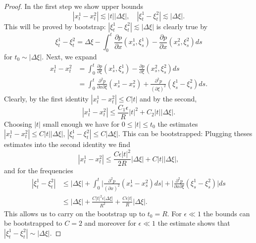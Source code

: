 \documentclass{amsart}
\theoremstyle{definition}
\begin{document}
\begin{proof}
In the first step we show upper bounds
\begin{equation*}
|x_t^1 - x_t^2| \lesssim |t| |\Delta \xi|, \quad |\xi_t^1 - \xi_t^2| \lesssim |\Delta \xi|.
\end{equation*}
This will be proved by bootstrap: $|\xi_t^1 - \xi_t^2| \lesssim |\Delta \xi|$ is clearly true by
\begin{equation*}
\xi_t^1 - \xi_t^2 = \Delta \xi - \int_0^t \frac{\partial p}{\partial x}(x_s^1,\xi_s^1) - \frac{\partial p}{\partial x}(x_s^2,\xi_s^2) ds
\end{equation*}
for $t_0 \sim |\Delta \xi|$.
Next, we expand
\begin{equation}
\label{eq:xtExpand}
\begin{split}
x_t^1 - x_t^2 &= \int_0^t \frac{\partial p}{\partial \xi}(x_s^1,\xi_s^1) - \frac{\partial p}{\partial \xi}(x_s^2,\xi_s^2) ds \\
&= \int_0^t \frac{\partial^2 p}{\partial x \partial \xi}(x_s^1-x_s^2) + \frac{\partial^2 p }{(\partial \xi)^2} (\xi_s^1 - \xi_s^2) ds.
\end{split}
\end{equation}
Clearly, by the first identity $|x_t^1 - x_t^2| \leq C |t|$ and by the second,
\begin{equation*}
|x_t^1 - x_t^2| \leq \frac{C_1 \epsilon}{R} |t|^2 + C_2 |t| |\Delta \xi|.
\end{equation*}
Choosing $|t|$ small enough we have for $0 \leq |t| \leq t_0$ the estimates $|x_t^1 - x_t^2| \leq C |t| |\Delta \xi|$, $|\xi_t^1 - \xi_t^2| \leq C |\Delta \xi|$. This can be bootstrapped: Plugging theses estimates into the second identity we find
\begin{equation*}
|x_t^1 - x_t^2| \leq \frac{C \epsilon |t|^2}{2R} |\Delta \xi| + C |t| |\Delta \xi|,
\end{equation*}
and for the frequencies
\begin{equation*}
\begin{split}
|\xi_t^1 - \xi_t^2| &\leq |\Delta \xi| + \int_0^t \big| \frac{\partial^2 p}{(\partial x)^2}(x_s^1 - x_s^2) ds \big| + \big| \frac{\partial^2 p}{\partial x \partial \xi} (\xi_s^1 - \xi_s^2) \big| ds \\
&\leq |\Delta \xi| + \frac{C |t|^2 \epsilon |\Delta \xi|}{R^2} + \frac{C \epsilon |t|}{R} |\Delta \xi|.
\end{split}
\end{equation*}
This allows us to carry on the bootstrap up to $t_0 = R$. For $\epsilon \ll 1$ the bounds can be bootstrapped to $C=2$ and moreover for $\epsilon \ll 1$ the estimate shows that $|\xi_t^1 - \xi_t^2| \sim |\Delta \xi|$.


\end{proof}
\end{document}
